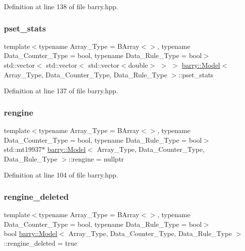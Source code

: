 Definition at line 138 of file barry.\+hpp.

\mbox{\label{classbarry_1_1_model_a3763f129965942611eb58e9779336f34}} 
\subsubsection{\texorpdfstring{pset\+\_\+stats}{pset\_stats}}
{\footnotesize\ttfamily template$<$typename Array\+\_\+\+Type  = B\+Array$<$$>$, typename Data\+\_\+\+Counter\+\_\+\+Type  = bool, typename Data\+\_\+\+Rule\+\_\+\+Type  = bool$>$ \\
std\+::vector$<$ std\+::vector$<$ std\+::vector$<$double$>$ $>$ $>$ \hyperlink{classbarry_1_1_model}{barry\+::\+Model}$<$ Array\+\_\+\+Type, Data\+\_\+\+Counter\+\_\+\+Type, Data\+\_\+\+Rule\+\_\+\+Type $>$\+::pset\+\_\+stats}



Definition at line 137 of file barry.\+hpp.

\mbox{\label{classbarry_1_1_model_adc85f6765d272293333a83bc2a4e90d2}} 
\subsubsection{\texorpdfstring{rengine}{rengine}}
{\footnotesize\ttfamily template$<$typename Array\+\_\+\+Type  = B\+Array$<$$>$, typename Data\+\_\+\+Counter\+\_\+\+Type  = bool, typename Data\+\_\+\+Rule\+\_\+\+Type  = bool$>$ \\
std\+::mt19937$\ast$ \hyperlink{classbarry_1_1_model}{barry\+::\+Model}$<$ Array\+\_\+\+Type, Data\+\_\+\+Counter\+\_\+\+Type, Data\+\_\+\+Rule\+\_\+\+Type $>$\+::rengine = nullptr}



Definition at line 104 of file barry.\+hpp.

\mbox{\label{classbarry_1_1_model_afe239e83969b6b99eddf1ecd509bc8f2}} 
\subsubsection{\texorpdfstring{rengine\+\_\+deleted}{rengine\_deleted}}
{\footnotesize\ttfamily template$<$typename Array\+\_\+\+Type  = B\+Array$<$$>$, typename Data\+\_\+\+Counter\+\_\+\+Type  = bool, typename Data\+\_\+\+Rule\+\_\+\+Type  = bool$>$ \\
bool \hyperlink{classbarry_1_1_model}{barry\+::\+Model}$<$ Array\+\_\+\+Type, Data\+\_\+\+Counter\+\_\+\+Type, Data\+\_\+\+Rule\+\_\+\+Type $>$\+::rengine\+\_\+deleted = true}



